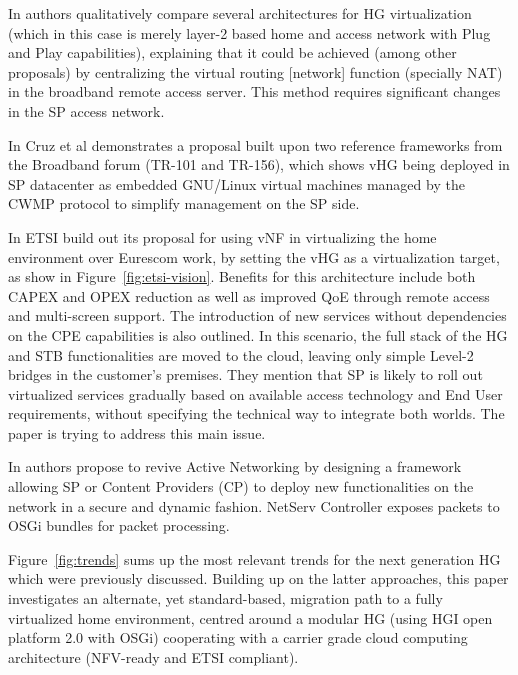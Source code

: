 In \cite{da_silva_home_2011} authors qualitatively compare several architectures for HG virtualization (which in this case is merely layer-2 based home and access network with Plug and Play capabilities), explaining that it could be achieved (among other proposals) by centralizing the virtual routing [network] function (specially NAT) in the broadband remote access server.
This method requires significant changes in the SP access network.

In \cite{cruz_architecture_2013} Cruz et al demonstrates a proposal built upon two reference frameworks from the Broadband forum (TR-101 and TR-156), which shows vHG being deployed in SP datacenter as embedded GNU/Linux virtual machines managed by the CWMP protocol to simplify management on the SP side.

In \cite{_network_2013} ETSI build out its proposal for using vNF in virtualizing the home environment over Eurescom work, by setting the vHG as a virtualization target, as show in Figure~\ref{fig:etsi-vision}.
Benefits for this architecture include both CAPEX and OPEX reduction as well as improved QoE through remote access and multi-screen support.
The introduction of new services without dependencies on the CPE capabilities is also outlined.
In this scenario, the full stack of the HG and STB functionalities are moved to the cloud, leaving only simple Level-2 bridges in the customer's premises.
They mention that SP is likely to roll out virtualized services gradually based on available access technology and End User requirements, without specifying the technical way to integrate both worlds.
The paper is trying to address this main issue.

In \cite{lee_netserv:_2011} authors propose to revive Active Networking by designing a framework allowing SP or Content Providers (CP) to deploy new functionalities on the network in a secure and dynamic fashion.
NetServ Controller exposes packets to OSGi bundles for packet processing.

Figure~\ref{fig:trends} sums up the most relevant trends for the next generation HG which were previously discussed.
Building up on the latter approaches, this paper investigates an alternate, yet standard-based, migration path to a fully virtualized home environment, centred around a modular HG (using HGI open platform 2.0 with OSGi) cooperating with a carrier grade cloud computing architecture (NFV-ready and ETSI compliant).




